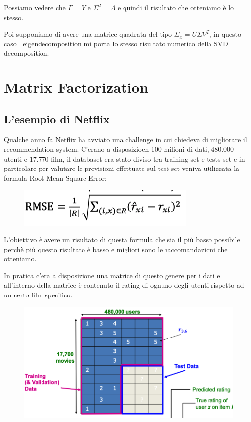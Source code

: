 \documentclass[14pt]{extreport}
\begin{document}
Possiamo vedere che $\Gamma = V$ e $\Sigma^2 = \Lambda$ e quindi il risultato che otteniamo è lo stesso.


Poi supponiamo di avere una matrice quadrata del tipo $\Sigma_x = U \Sigma V^T$, in questo caso l'eigendecomposition mi porta lo stesso risultato numerico 
della SVD decomposition.



\section{Matrix Factorization}

\subsection{L'esempio di Netflix}

Qualche anno fa Netflix ha avviato una challenge in cui chiedeva di migliorare il recommendation system.
C'erano a disposizioen 100 milioni di dati, 480.000 utenti e 17.770 film, il databaset era stato diviso tra training set e tests set e in particolare per 
valutare le previsioni effettuate sul test set veniva utilizzata la formula Root Mean Square Error:


\begin{figure}[H] 
\centering
\includegraphics[width=0.7\linewidth]{511.jpeg}
\end{figure}

L'obiettivo è avere un risultato di questa formula che sia il più basso possibile perchè più questo risultato è basso e 
migliori sono le raccomandazioni che otteniamo.

In pratica c'era a disposizione una matrice di questo genere per i dati e all'interno della matrice è contenuto il rating di ognuno degli utenti
rispetto ad un certo film specifico:

\begin{figure}[H] 
\centering
\includegraphics[width=0.7\linewidth]{512.jpeg}
\end{figure}
\end{document}
